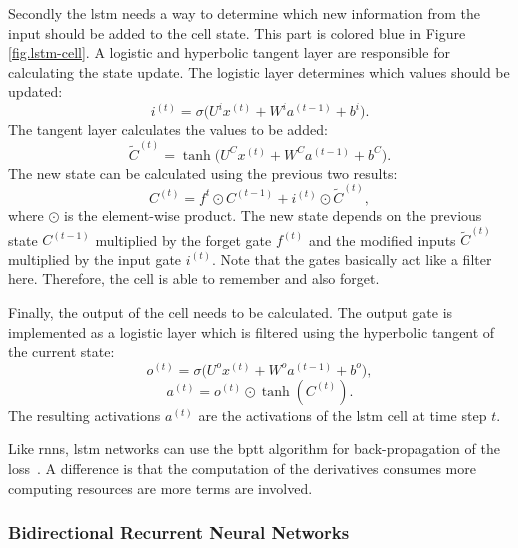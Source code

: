 Secondly the \gls{lstm} needs a way to determine which new information from the input should be added to the cell state. This part is colored blue in Figure \ref{fig.lstm-cell}.
A logistic and hyperbolic tangent layer are responsible for calculating the state update.
The logistic layer determines which values should be updated:
\begin{equation}
	i^{(t)}=\sigma\Big(U^i x^{(t)} + W^i a^{(t-1)} + b^i\Big).
\end{equation}
The tangent layer calculates the values to be added:
\begin{equation}
	\tilde{C}^{(t)}=\tanh\Big(U^C x^{(t)} + W^C a^{(t-1)} + b^C\Big).
\end{equation}
The new state can be calculated using the previous two results:
\begin{equation}
	C^{(t)}=f^t \odot C^{(t-1)} + i^{(t)} \odot \tilde{C}^{(t)},
\end{equation}
where $\odot$ is the element-wise product.
The new state depends on the previous state $C^{(t-1)}$ multiplied by the forget gate $f^{(t)}$ and the modified inputs $\tilde{C}^{(t)}$ multiplied by the input gate $i^{(t)}$. Note that the gates basically act like a filter here. Therefore, the cell is able to remember and also forget.~\cite[p.~399]{Goodfellow2016}

Finally, the output of the cell needs to be calculated. The output gate is implemented as a logistic layer which is filtered using the hyperbolic tangent of the current state:
\begin{equation}
	o^{(t)}=\sigma\Big(U^o x^{(t)} + W^o a^{(t-1)} + b^o\Big),
\end{equation}
\begin{equation}
	a^{(t)}=o^{(t)} \odot \tanh(C^{(t)}).
\end{equation}
The resulting activations $a^{(t)}$ are the activations of the \gls{lstm} cell at time step $t$.~\cite[p.~399]{Goodfellow2016}

Like \glspl{rnn}, \gls{lstm} networks can use the \gls{bptt} algorithm for back-propagation of the loss~\cite[p.~43]{Graves2012}. A difference is that the computation of the derivatives consumes more computing resources are more terms are involved.

\subsubsection{Bidirectional Recurrent Neural Networks}\label{sec.bidi-rnn}

